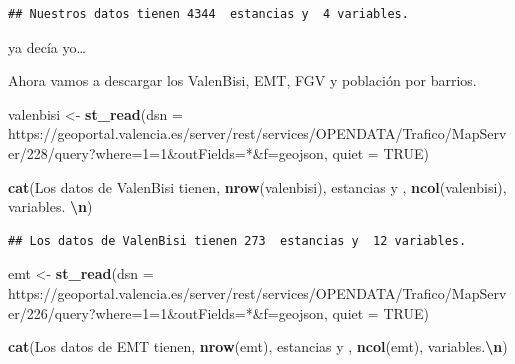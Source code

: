 \documentclass[notspecified,article,submit,moreauthors,pdftex]{Definitions/mdpi}
\newenvironment{Shaded}{\begin{snugshade}}{\end{snugshade}}
\newcommand{\AttributeTok}[1]{\textcolor[rgb]{0.13,0.29,0.53}{#1}}
\newcommand{\ConstantTok}[1]{\textcolor[rgb]{0.56,0.35,0.01}{#1}}
\newcommand{\FunctionTok}[1]{\textcolor[rgb]{0.13,0.29,0.53}{\textbf{#1}}}
\newcommand{\NormalTok}[1]{#1}
\newcommand{\OtherTok}[1]{\textcolor[rgb]{0.56,0.35,0.01}{#1}}
\newcommand{\SpecialCharTok}[1]{\textcolor[rgb]{0.81,0.36,0.00}{\textbf{#1}}}
\newcommand{\StringTok}[1]{\textcolor[rgb]{0.31,0.60,0.02}{#1}}
\begin{document}
\begin{verbatim}
## Nuestros datos tienen 4344  estancias y  4 variables.
\end{verbatim}

ya decía yo\ldots{}

Ahora vamos a descargar los ValenBisi, EMT, FGV y población por barrios.

\begin{Shaded}
\begin{Highlighting}[]
\NormalTok{valenbisi }\OtherTok{\textless{}{-}} \FunctionTok{st\_read}\NormalTok{(}\AttributeTok{dsn =} \StringTok{\textquotesingle{}https://geoportal.valencia.es/server/rest/services/OPENDATA/Trafico/MapServer/228/query?where=1=1\&outFields=*\&f=geojson\textquotesingle{}}\NormalTok{, }\AttributeTok{quiet =} \ConstantTok{TRUE}\NormalTok{)}

\FunctionTok{cat}\NormalTok{(}\StringTok{\textquotesingle{}Los datos de ValenBisi tienen\textquotesingle{}}\NormalTok{, }\FunctionTok{nrow}\NormalTok{(valenbisi), }\StringTok{\textquotesingle{} estancias y \textquotesingle{}}\NormalTok{, }\FunctionTok{ncol}\NormalTok{(valenbisi), }\StringTok{\textquotesingle{}variables. }\SpecialCharTok{\textbackslash{}n}\StringTok{\textquotesingle{}}\NormalTok{)}
\end{Highlighting}
\end{Shaded}

\begin{verbatim}
## Los datos de ValenBisi tienen 273  estancias y  12 variables.
\end{verbatim}

\begin{Shaded}
\begin{Highlighting}[]
\NormalTok{emt }\OtherTok{\textless{}{-}} \FunctionTok{st\_read}\NormalTok{(}\AttributeTok{dsn =} \StringTok{\textquotesingle{}https://geoportal.valencia.es/server/rest/services/OPENDATA/Trafico/MapServer/226/query?where=1=1\&outFields=*\&f=geojson\textquotesingle{}}\NormalTok{, }\AttributeTok{quiet =} \ConstantTok{TRUE}\NormalTok{)}

\FunctionTok{cat}\NormalTok{(}\StringTok{\textquotesingle{}Los datos de EMT tienen\textquotesingle{}}\NormalTok{, }\FunctionTok{nrow}\NormalTok{(emt), }\StringTok{\textquotesingle{} estancias y \textquotesingle{}}\NormalTok{, }\FunctionTok{ncol}\NormalTok{(emt), }\StringTok{\textquotesingle{}variables.}\SpecialCharTok{\textbackslash{}n}\StringTok{\textquotesingle{}}\NormalTok{)}
\end{Highlighting}
\end{Shaded}
\end{document}
